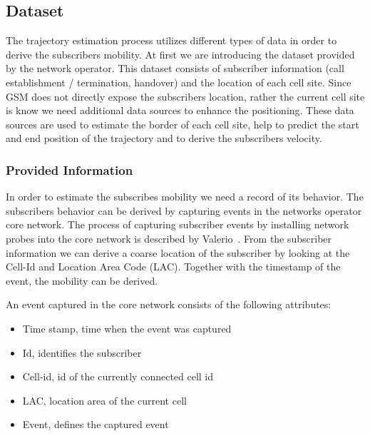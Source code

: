\documentclass[twocolumn]{bmcart}%
\begin{document}
\subsection*{Dataset}
The trajectory estimation process utilizes different types of data in order to derive the subscribers mobility. At first we are introducing the dataset provided by the network operator. This dataset consists of subscriber information (call establishment / termination, handover) and the location of each cell site. Since GSM does not directly expose the subscribers location, rather the current cell site is know we need additional data sources to enhance the positioning. These data sources are used to estimate the border of each cell site, help to predict the start and end position of the trajectory and to derive the subscribers velocity.
\subsubsection*{Provided Information}
In order to estimate the subscribes mobility we need a record of its behavior. The subscribers behavior can be derived by capturing events in the networks operator core network. The process of capturing subscriber events by installing network probes into the core network is described by Valerio~\cite{RoadCell2009}. From the subscriber information we can derive a coarse location of the subscriber by looking at the Cell-Id and Location Area Code (LAC). Together with the timestamp of the event, the mobility can be derived.

An event captured in the core network consists of the following attributes:
\begin{itemize}
\item Time stamp, time when the event was captured
\item Id, identifies the subscriber
\item Cell-id, id of the currently connected cell id
\item LAC, location area of the current cell
\item Event, defines the captured event
\end{itemize}
\end{document}
